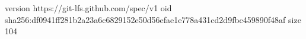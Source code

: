 version https://git-lfs.github.com/spec/v1
oid sha256:df0941ff281b2a23a6c6829152e50d56efae1e778a431cd2d9fbc459890f48af
size 104
